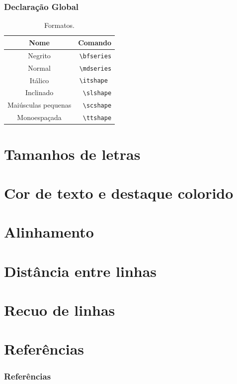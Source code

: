 \documentclass{beamer}
\begin{document}
\begin{frame}[fragile]
    \frametitle{Declaração Global}

    \begin{table}[h]
        \caption{Formatos.}
        \begin{tabular}{c|r}
            Nome & Comando \\ \hline 
            Negrito & \lstinline[style=myStyleLatex]!\bfseries! \\ \hline 
            Normal & \lstinline[style=myStyleLatex]!\mdseries! \\ \hline 
            Itálico & \lstinline[style=myStyleLatex]!\itshape ! \\ \hline 
            Inclinado & \lstinline[style=myStyleLatex]!\slshape! \\ \hline
            Maiúsculas pequenas & \lstinline[style=myStyleLatex]!\scshape! \\ \hline
            Monoespaçada & \lstinline[style=myStyleLatex]!\ttshape! \\ \hline
        \end{tabular}
    \end{table}

\end{frame}

\section{Tamanhos de letras}

\section{Cor de texto e destaque colorido}

\section{Alinhamento}

\section{Distância entre linhas}

\section{Recuo de linhas}

\section{Referências}
\begin{frame}[allowframebreaks]
    \frametitle{Referências}
    \nocite{*}
    \printbibliography[keyword={editText}]
\end{frame}
\end{document}
